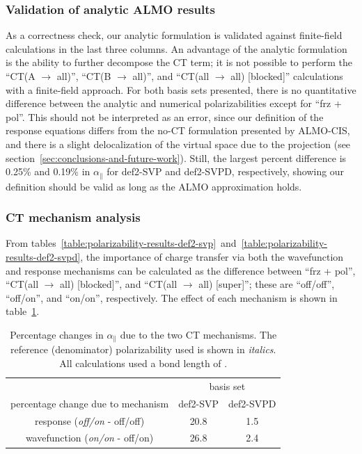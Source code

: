 \documentclass[%
  class = book,%
  crop = false,%
  float = true,%
  multi = true,%
  preview = false,%
]{standalone}
\begin{document}
\subsubsection{Validation of analytic ALMO results}
\label{sssec:results-validation}

As a correctness check, our analytic formulation is validated against finite-field calculations in the last three columns. An advantage of the analytic formulation is the ability to further decompose the CT term; it is not possible to perform the ``CT(A \(\rightarrow\) all)'', ``CT(B \(\rightarrow\) all)'', and ``CT(all \(\rightarrow\) all) [blocked]'' calculations with a finite-field approach. For both basis sets presented, there is no quantitative difference between the analytic and numerical polarizabilities except for ``frz + pol''. This should not be interpreted as an error, since our definition of the response equations differs from the no-CT formulation presented by ALMO-CIS, and there is a slight delocalization of the virtual space due to the projection (see section~\ref{sec:conclusions-and-future-work}). Still, the largest percent difference is 0.25\% and 0.19\% in \(\alpha_{\parallel}\) for def2-SVP and def2-SVPD, respectively, showing our definition should be valid as long as the ALMO approximation holds.

\subsubsection{CT mechanism analysis}
\label{sssec:ct-mechanism-analysis}

From tables~\ref{table:polarizability-results-def2-svp}~and~\ref{table:polarizability-results-def2-svpd}, the importance of charge transfer via both the wavefunction and response mechanisms can be calculated as the difference between ``frz + pol'', ``CT(all \(\rightarrow\) all) [blocked]'', and ``CT(all \(\rightarrow\) all) [super]''; these are ``off/off'', ``off/on'', and ``on/on'', respectively. The effect of each mechanism is shown in table~\ref{tab:mechanism-percentage-changes}.

\begin{table}
  \centering
  \caption[Percentage changes in argon\textemdash{}lithium cation dimer \(\alpha_{\parallel}\) due to the two CT mechanisms]{Percentage changes in \(\alpha_{\parallel}\) due to the two CT mechanisms. The reference (denominator) polarizability used is shown in \textit{italics}. All calculations used a bond length of \geomdeftsvpd{}.}
  \label{tab:mechanism-percentage-changes}
  \begin{tabular}{ccc}
    \toprule
                                           & \multicolumn{2}{c}{basis set} \\
                                             \cmidrule{2-3}
    percentage change due to mechanism     & def2-SVP    & def2-SVPD       \\
    \midrule
    response (\textit{off/on} - off/off)   & 20.8        & 1.5             \\
    wavefunction (\textit{on/on} - off/on) & 26.8        & 2.4             \\
    \bottomrule
  \end{tabular}
\end{table}
\end{document}
